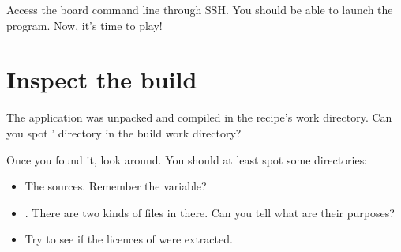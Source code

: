 Access the board command line through SSH. You should be able to
launch the  program. Now, it's time to play!

\section{Inspect the build}

The  application was unpacked and compiled in the
recipe's work directory. Can you spot ' directory in
the build work directory?

Once you found it, look around. You should at least spot some
directories:
\begin{itemize}
    \item The sources. Remember the  variable?
    \item {}. There are two kinds of files in there. Can you
      tell what are their purposes?
    \item Try to see if the licences of  were
      extracted.
\end{itemize}
